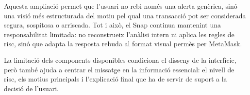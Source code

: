 Aquesta ampliació permet que l’usuari no rebi només una alerta genèrica, sinó una visió més estructurada del motiu pel qual una transacció pot ser considerada segura, sospitosa o arriscada. Tot i això, el Snap continua mantenint una responsabilitat limitada: no reconstrueix l’anàlisi intern ni aplica les regles de risc, sinó que adapta la resposta rebuda al format visual permès per MetaMask.

La limitació dels components disponibles condiciona el disseny de la interfície, però també ajuda a centrar el missatge en la informació essencial: el nivell de risc, els motius principals i l’explicació final que ha de servir de suport a la decisió de l’usuari.
